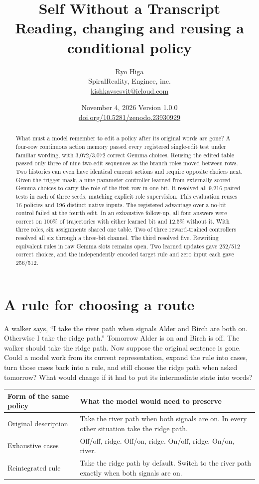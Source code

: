 \documentclass[11pt]{article}
\title{Self Without a Transcript\\\large Reading, changing and reusing a conditional policy}
\author{Ryo Higa\\{\small SpiralReality, Enginee, inc.}\\{\small\href{mailto:kishkavsesvit@icloud.com}{kishkavsesvit@icloud.com}}}
\date{November 4, 2026 \quad Version 1.0.0\\{\small\href{https://doi.org/10.5281/zenodo.23930929}{doi.org/10.5281/zenodo.23930929}}}
\begin{document}
\maketitle


\begin{abstract}
What must a model remember to edit a policy after its original words are gone? A four-row continuous action memory passed every registered single-edit test under familiar wording, with 3,072/3,072 correct Gemma choices. Reusing the edited table passed only three of nine two-edit sequences as the branch roles moved between rows. Two histories can even have identical current actions and require opposite choices next. Given the trigger mask, a nine-parameter controller learned from externally scored Gemma choices to carry the role of the first row in one bit. It resolved all 9,216 paired tests in each of three seeds, matching explicit role supervision. This evaluation reuses 16 policies and 196 distinct native inputs. The registered advantage over a no-bit control failed at the fourth edit. In an exhaustive follow-up, all four answers were correct on 100\% of trajectories with either learned bit and 12.5\% without it. With three roles, six assignments shared one table. Two of three reward-trained controllers resolved all six through a three-bit channel. The third resolved five. Rewriting equivalent rules in raw Gemma slots remains open. Two learned updates gave 252/512 correct choices, and the independently encoded target rule and zero input each gave 256/512.
\end{abstract}

\section{A rule for choosing a route}

A walker says, ``I take the river path when signals Alder and Birch are both on. Otherwise I take the ridge path.'' Tomorrow Alder is on and Birch is off. The walker should take the ridge path. Now suppose the original sentence is gone. Could a model work from its current representation, expand the rule into cases, turn those cases back into a rule, and still choose the ridge path when asked tomorrow? What would change if it had to put its intermediate state into words?

\begin{center}
\small\renewcommand{\arraystretch}{1.15}
\begin{tabular}{@{}p{.26\linewidth}p{.69\linewidth}@{}}
\toprule
Form of the same policy & What the model would need to preserve \\
\midrule
Original description & Take the river path when both signals are on. In every other situation take the ridge path. \\
Exhaustive cases & Off/off, ridge. Off/on, ridge. On/off, ridge. On/on, river. \\
Reintegrated rule & Take the ridge path by default. Switch to the river path exactly when both signals are on. \\
\bottomrule
\end{tabular}
\end{center}
\end{document}
